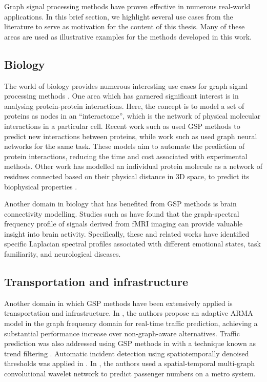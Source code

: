 Graph signal processing methods have proven effective in numerous real-world applications. In this brief section, we highlight several use cases from the literature to serve as motivation for the content of this thesis. Many of these areas are used as illustrative examples for the methods developed in this work.


\subsection{Biology}

The world of biology provides numerous interesting use cases for graph signal processing methods \citep{Li2023}. One area which has garnered significant interest is in analysing protein-protein interactions. Here, the concept is to model a set of proteins as nodes in an ``interactome'', which is the network of physical molecular interactions in a particular cell. Recent work such as \cite{Colonnese2021} used GSP methods to predict new interactions between proteins, while work such as \cite{Jha2022} used graph neural networks for the same task. These models aim to automate the prediction of protein interactions, reducing the time and cost associated with experimental methods. Other work has modelled an individual protein molecule as a network of residues connected based on their physical distance in 3D space, to predict its biophysical properties \citep{Srivastava2023}. 

Another domain in biology that has benefited from GSP methods is brain connectivity modelling. Studies such as \cite{Goldsberry2017, Atasoy2016, Menoret2017, Itani2021} have found that the graph-spectral frequency profile of signals derived from fMRI imaging can provide valuable insight into brain activity. Specifically, these and related works have identified specific Laplacian spectral profiles associated with different emotional states, task familiarity, and neurological diseases.

\subsection{Transportation and infrastructure}

Another domain in which GSP methods have been extensively applied is transportation and infrastructure. In \cite{Hasanzadeh2017}, the authors propose an adaptive ARMA model in the graph frequency domain for real-time traffic prediction, achieving a substantial performance increase over non-graph-aware alternatives. Traffic prediction was also addressed using GSP methods in \cite{Chakraborty2017} with a technique known as trend filtering \citep{Wang2016}. Automatic incident detection using spatiotemporally denoised thresholds was applied in \citep{Chakraborty2019}. In \cite{Xiu2022}, the authors used a spatial-temporal multi-graph convolutional wavelet network to predict passenger numbers on a metro system.

